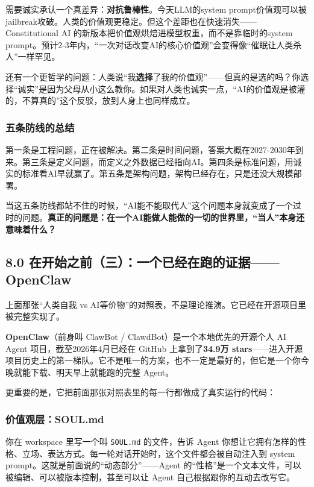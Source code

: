 \documentclass[11pt,a4paper]{ctexart}
\begin{document}
需要诚实承认一个真差异：\textbf{对抗鲁棒性}。今天LLM的system prompt价值观可以被jailbreak攻破。人类的价值观更稳定。但这个差距也在快速消失——Constitutional AI 的新版本把价值观烘焙进模型权重，而不是靠临时的system prompt。预计2-3年内，“一次对话改变AI的核心价值观”会变得像“催眠让人类杀人”一样罕见。

还有一个更哲学的问题：人类说“我\textbf{选择}了我的价值观”——但真的是选的吗？你选择“诚实”是因为父母从小这么教你。如果对人类也诚实一点，“AI的价值观是被灌的，不算真的”这个反驳，放到人身上也同样成立。

\subsubsection{五条防线的总结}

第一条是工程问题，正在被解决。第二条是时间问题，答案大概在2027-2030年到来。第三条是定义问题，而定义之外数据已经指向AI。第四条是标准问题，用诚实的标准看AI早就赢了。第五条是架构问题，架构已经存在，只是还没大规模部署。

当这五条防线都站不住的时候，“AI能不能取代人”这个问题本身就变成了一个过时的问题。\textbf{真正的问题是：在一个AI能做人能做的一切的世界里，“当人”本身还意味着什么？}

\subsection{8.0 在开始之前（三）：一个已经在跑的证据——OpenClaw}

上面那张“人类自我 vs AI等价物”的对照表，不是理论推演。它已经在开源项目里被完整实现了。

\textbf{OpenClaw}（前身叫 ClawBot / ClawdBot）是一个本地优先的开源个人 AI Agent 项目，截至2026年4月已经在 GitHub 上拿到了\textbf{34.9万 stars}——进入开源项目历史上的第一梯队。它不是唯一的方案，也不一定是最好的，但它是一个你今晚就能下载、明天早上就能跑的完整 Agent。

更重要的是，它把前面那张对照表里的每一行都做成了真实运行的代码：

\subsubsection{价值观层：SOUL.md}

你在 workspace 里写一个叫 \texttt{SOUL.md} 的文件，告诉 Agent 你想让它拥有怎样的性格、立场、表达方式。每一轮对话开始时，这个文件都会被自动注入到 system prompt。这就是前面说的“动态部分”——Agent 的“性格”是一个文本文件，可以被编辑、可以被版本控制，甚至可以让 Agent 自己根据跟你的互动去改写它。
\end{document}
